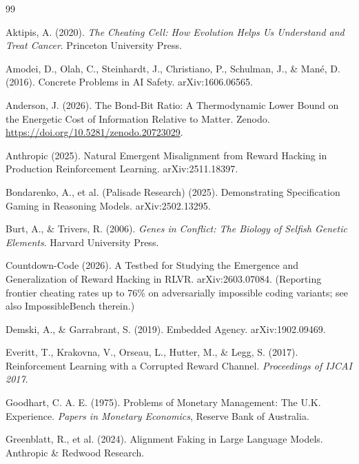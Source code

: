 \documentclass[11pt]{article}
\begin{document}
\begin{thebibliography}{99}
\setlength{\itemsep}{0.15em}

 Aktipis, A. (2020). \emph{The Cheating Cell: How Evolution Helps Us Understand and Treat Cancer}. Princeton University Press.

 Amodei, D., Olah, C., Steinhardt, J., Christiano, P., Schulman, J., \& Man\'e, D. (2016). Concrete Problems in AI Safety. arXiv:1606.06565.

 Anderson, J. (2026). The Bond-Bit Ratio: A Thermodynamic Lower Bound on the Energetic Cost of Information Relative to Matter. Zenodo. \url{https://doi.org/10.5281/zenodo.20723029}.

 Anthropic (2025). Natural Emergent Misalignment from Reward Hacking in Production Reinforcement Learning. arXiv:2511.18397.

 Bondarenko, A., et al. (Palisade Research) (2025). Demonstrating Specification Gaming in Reasoning Models. arXiv:2502.13295.

 Burt, A., \& Trivers, R. (2006). \emph{Genes in Conflict: The Biology of Selfish Genetic Elements}. Harvard University Press.

 Countdown-Code (2026). A Testbed for Studying the Emergence and Generalization of Reward Hacking in RLVR. arXiv:2603.07084. (Reporting frontier cheating rates up to 76\% on adversarially impossible coding variants; see also ImpossibleBench therein.)

 Demski, A., \& Garrabrant, S. (2019). Embedded Agency. arXiv:1902.09469.

 Everitt, T., Krakovna, V., Orseau, L., Hutter, M., \& Legg, S. (2017). Reinforcement Learning with a Corrupted Reward Channel. \emph{Proceedings of IJCAI 2017}.

 Goodhart, C. A. E. (1975). Problems of Monetary Management: The U.K. Experience. \emph{Papers in Monetary Economics}, Reserve Bank of Australia.

 Greenblatt, R., et al. (2024). Alignment Faking in Large Language Models. Anthropic \& Redwood Research.


\end{thebibliography}
\end{document}
